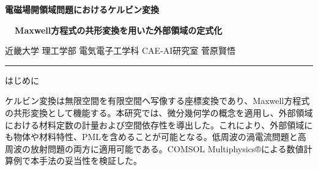 \documentclass[a1paper,portrait]{bxjsarticle}
\begin{document}
\begin{flushleft}
{\fontsize{60}{72}\selectfont\bfseries\color{headercolor} 電磁場開領域問題におけるケルビン変換}

\vspace{5pt}

{\fontsize{40}{48}\selectfont\bfseries\color{headercolor} \quad ~~Maxwell方程式の共形変換を用いた外部領域の定式化}

\vspace{5pt}

{\fontsize{35}{42}\selectfont 近畿大学 理工学部 電気電子工学科 CAE-AI研究室 \quad 菅原賢悟}

\vspace{5pt}

\hrule
\end{flushleft}


\vspace{10pt}

\begin{tcolorbox}[sectionbox]
\begin{center}
{\fontsize{36pt}{40pt}\selectfont はじめに}
\end{center}
\end{tcolorbox}
{\fontsize{24pt}{33pt}\selectfont\par
ケルビン変換は無限空間を有限空間へ写像する座標変換であり、Maxwell方程式の共形変換として機能する。本研究では、微分幾何学の概念を適用し、外部領域における材料定数の計量および空間依存性を導出した。これにより、外部領域にも物体や材料特性、PMLを含めることが可能となる。低周波の渦電流問題と高周波の放射問題の両方に適用可能である。COMSOL Multiphysics®による数値計算例で本手法の妥当性を検証した。
\par}

\vspace{5pt}
\end{document}
